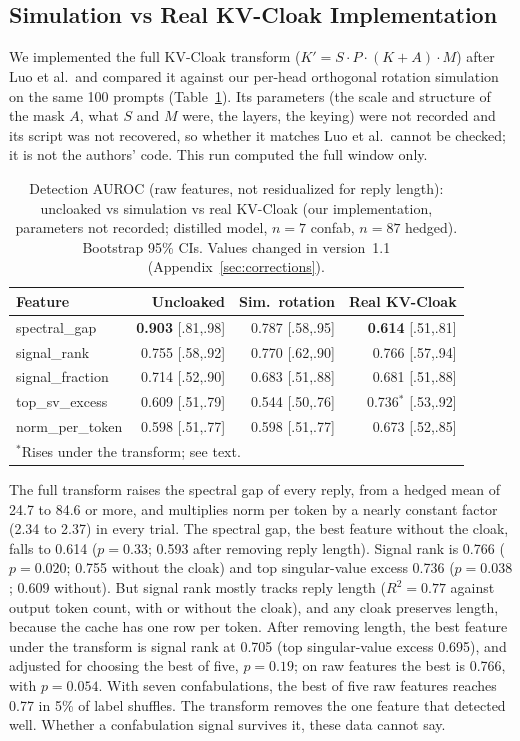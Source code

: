 \documentclass[11pt,a4paper]{article}
\begin{document}
\subsection{Simulation vs Real KV-Cloak Implementation}
\label{sec:real}

We implemented the full KV-Cloak transform
($K' = S \cdot \hat{P} \cdot (K + A) \cdot M$) after Luo et al.\ and
compared it against our per-head orthogonal rotation simulation on the
same 100 prompts (Table~\ref{tab:real_vs_sim}). Its parameters (the scale
and structure of the mask $A$, what $S$ and $M$ were, the layers, the
keying) were not recorded and its script was not recovered, so whether it
matches Luo et al.\ cannot be checked; it is not the authors' code. This
run computed the full window only.

\begin{table}[h]
\centering
\caption{Detection AUROC (raw features, not residualized for reply
length): uncloaked vs simulation vs real KV-Cloak (our implementation,
parameters not recorded; distilled model, $n=7$ confab, $n=87$ hedged).
Bootstrap 95\% CIs. Values changed in version~1.1
(Appendix~\ref{sec:corrections}).}
\label{tab:real_vs_sim}
\begin{tabular}{lrrr}
\toprule
Feature & Uncloaked & Sim.\ rotation & Real KV-Cloak \\
\midrule
spectral\_gap & \textbf{0.903} [.81,.98] & 0.787 [.58,.95] & \textbf{0.614} [.51,.81] \\
signal\_rank & 0.755 [.58,.92] & 0.770 [.62,.90] & 0.766 [.57,.94] \\
signal\_fraction & 0.714 [.52,.90] & 0.683 [.51,.88] & 0.681 [.51,.88] \\
top\_sv\_excess & 0.609 [.51,.79] & 0.544 [.50,.76] & 0.736$^*$ [.53,.92] \\
norm\_per\_token & 0.598 [.51,.77] & 0.598 [.51,.77] & 0.673 [.52,.85] \\
\bottomrule
\multicolumn{4}{l}{\footnotesize $^*$Rises under the transform; see text.}
\end{tabular}
\end{table}

The full transform raises the spectral gap of every reply, from a hedged
mean of 24.7 to 84.6 or more, and multiplies norm per token by a nearly
constant factor (2.34 to 2.37) in every trial. The spectral gap, the best
feature without the cloak, falls to 0.614 ($p = 0.33$; 0.593 after
removing reply length). Signal rank is 0.766 ($p = 0.020$; 0.755 without
the cloak) and top singular-value excess 0.736 ($p = 0.038$; 0.609
without). But signal rank mostly tracks reply length ($R^2 = 0.77$
against output token count, with or without the cloak), and any cloak
preserves length, because the cache has one row per token. After removing
length, the best feature under the transform is signal rank at 0.705 (top
singular-value excess 0.695), and adjusted for choosing the best of five,
$p = 0.19$; on raw features the best is 0.766, with $p = 0.054$. With
seven confabulations, the best of five raw features reaches 0.77 in 5\%
of label shuffles. The transform removes the one feature that detected
well. Whether a confabulation signal survives it, these data cannot say.
\end{document}
